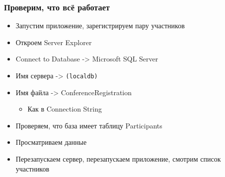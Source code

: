 \documentclass[xetex,mathserif,serif]{beamer}
\begin{document}
    \begin{frame}
        \frametitle{Проверим, что всё работает}
        \begin{itemize}
            \item Запустим приложение, зарегистрируем пару участников
            \item Откроем Server Explorer
            \item Connect to Database -> Microsoft SQL Server
            \item Имя сервера -> \texttt{(localdb)\mssqllocaldb}
            \item Имя файла -> ConferenceRegistration
            \begin{itemize}
                \item Как в Connection String
            \end{itemize}
            \item Проверяем, что база имеет таблицу Participants
            \item Просматриваем данные
            \item Перезапускаем сервер, перезапускаем приложение, смотрим список участников
        \end{itemize}
    \end{frame}
\end{document}
